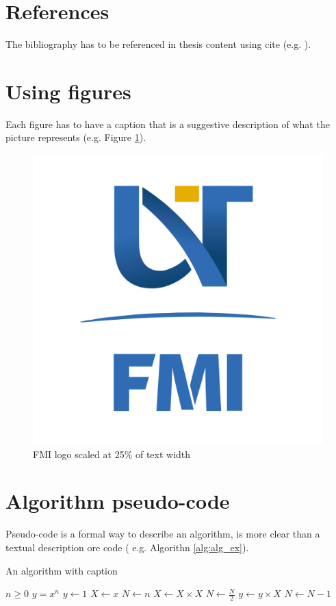 \documentclass[12pt,a4paper]{book}
\theoremstyle{definition}
\theoremstyle{remark}
\begin{document}
\section{References}
The bibliography has to be referenced in thesis content using cite (e.g. \cite{Bersani}).

\section{Using figures}
Each figure has to have a caption that is a suggestive description of what  the  picture represents (e.g. Figure \ref{fig:siglaUVT}).
\begin{figure}[!ht]
    \centering
    \includegraphics[width=0.25\linewidth]{template-eng/FMI-03.png}
    \caption{ FMI logo scaled at 25\% of text width}
    \label{fig:siglaUVT}
\end{figure}

\section{Algorithm pseudo-code}
Pseudo-code is a formal way to describe an algorithm, is more clear than a textual description ore code ( e.g. Algorithn \ref{alg:alg_ex}).

\begin{algorithm}[!ht]
\caption{An algorithm with caption}\label{alg:alg_ex}
\begin{algorithmic}[1]
\Require $n \geq 0$
\Ensure $y = x^n$
\State $y \gets 1$
\State $X \gets x$
\State $N \gets n$
    \State $X \gets X \times X$
    \State $N \gets \frac{N}{2}$  
    \State $y \gets y \times X$
    \State $N \gets N - 1$
\EndIf
\EndWhile
\end{algorithmic}
\end{algorithm}
\end{document}
